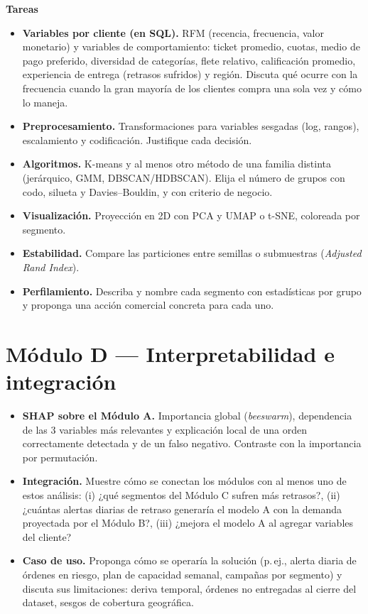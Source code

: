 \documentclass[11pt,letterpaper]{article}
\begin{document}
\textbf{Tareas}
\begin{itemize}
  \item \textbf{Variables por cliente (en SQL).} RFM (recencia, frecuencia, valor monetario) y variables de comportamiento: ticket promedio, cuotas, medio de pago preferido, diversidad de categorías, flete relativo, calificación promedio, experiencia de entrega (retrasos sufridos) y región. Discuta qué ocurre con la frecuencia cuando la gran mayoría de los clientes compra una sola vez y cómo lo maneja.
  \item \textbf{Preprocesamiento.} Transformaciones para variables sesgadas (log, rangos), escalamiento y codificación. Justifique cada decisión.
  \item \textbf{Algoritmos.} K-means y al menos otro método de una familia distinta (jerárquico, GMM, DBSCAN/HDBSCAN). Elija el número de grupos con codo, silueta y Davies--Bouldin, y con criterio de negocio.
  \item \textbf{Visualización.} Proyección en 2D con PCA y UMAP o t-SNE, coloreada por segmento.
  \item \textbf{Estabilidad.} Compare las particiones entre semillas o submuestras (\emph{Adjusted Rand Index}).
  \item \textbf{Perfilamiento.} Describa y nombre cada segmento con estadísticas por grupo y proponga una acción comercial concreta para cada uno.
\end{itemize}

\section{Módulo D — Interpretabilidad e integración}
\begin{itemize}
  \item \textbf{SHAP sobre el Módulo A.} Importancia global (\emph{beeswarm}), dependencia de las 3 variables más relevantes y explicación local de una orden correctamente detectada y de un falso negativo. Contraste con la importancia por permutación.
  \item \textbf{Integración.} Muestre cómo se conectan los módulos con al menos uno de estos análisis: (i) ¿qué segmentos del Módulo C sufren más retrasos?, (ii) ¿cuántas alertas diarias de retraso generaría el modelo A con la demanda proyectada por el Módulo B?, (iii) ¿mejora el modelo A al agregar variables del cliente?
  \item \textbf{Caso de uso.} Proponga cómo se operaría la solución (p.\,ej., alerta diaria de órdenes en riesgo, plan de capacidad semanal, campañas por segmento) y discuta sus limitaciones: deriva temporal, órdenes no entregadas al cierre del dataset, sesgos de cobertura geográfica.
\end{itemize}
\end{document}
